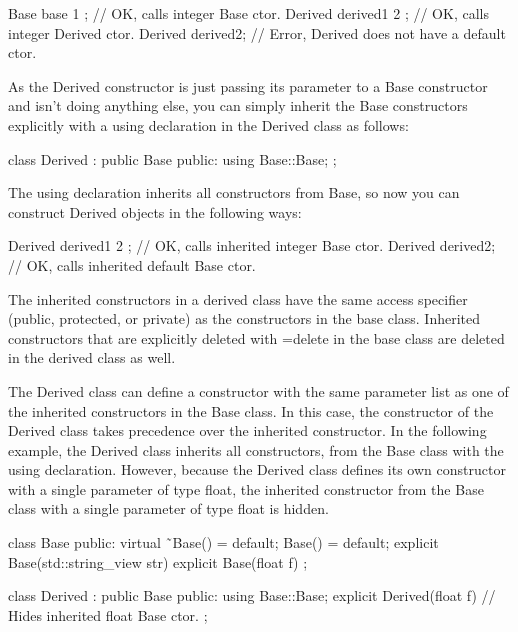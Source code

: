 \begin{cpp}
Base base { 1 }; // OK, calls integer Base ctor.
Derived derived1 { 2 }; // OK, calls integer Derived ctor.
Derived derived2; // Error, Derived does not have a default ctor.
\end{cpp}

As the Derived constructor is just passing its parameter to a Base constructor and isn’t doing anything else, you can simply inherit the Base constructors explicitly with a using declaration in the Derived class as follows:

\begin{cpp}
class Derived : public Base
{
    public:
        using Base::Base;
};
\end{cpp}

The using declaration inherits all constructors from Base, so now you can construct Derived objects in the following ways:

\begin{cpp}
Derived derived1 { 2 }; // OK, calls inherited integer Base ctor.
Derived derived2; // OK, calls inherited default Base ctor.
\end{cpp}

The inherited constructors in a derived class have the same access specifier (public, protected, or private) as the constructors in the base class. Inherited constructors that are explicitly deleted with =delete in the base class are deleted in the derived class as well.


The Derived class can define a constructor with the same parameter list as one of the inherited constructors in the Base class. In this case, the constructor of the Derived class takes precedence over the inherited constructor. In the following example, the Derived class inherits all constructors, from the Base class with the using declaration. However, because the Derived class defines its own constructor with a single parameter of type float, the inherited constructor from the Base class with a single parameter of type float is hidden.

\begin{cpp}
class Base
{
    public:
        virtual ˜Base() = default;
        Base() = default;
        explicit Base(std::string_view str) {}
        explicit Base(float f) {}
};

class Derived : public Base
{
    public:
        using Base::Base;
        explicit Derived(float f) {} // Hides inherited float Base ctor.
};
\end{cpp}


